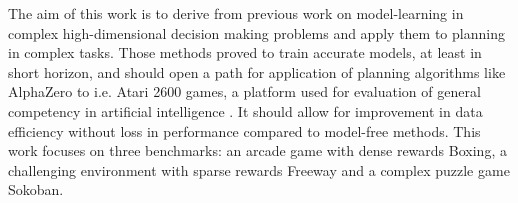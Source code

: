 The aim of this work is to derive from previous work on model-learning in complex high-dimensional decision making problems \cite{Algo.RecurrentEnvSim}\cite{Algo.JointFrameRewardPrediction}\cite{Algo.FastGenerativeModels}\cite{Algo.PlaNet} and apply them to planning in complex tasks. Those methods proved to train accurate models, at least in short horizon, and should open a path for application of planning algorithms like AlphaZero \cite{Algo.AlphaZero} to i.e. Atari 2600 games, a platform used for evaluation of general competency in artificial intelligence \cite{Benchmark.RevisitingALE}. It should allow for improvement in data efficiency without loss in performance compared to model-free methods. This work focuses on three benchmarks: an arcade game with dense rewards Boxing, a challenging environment with sparse rewards Freeway and a complex puzzle game Sokoban.
